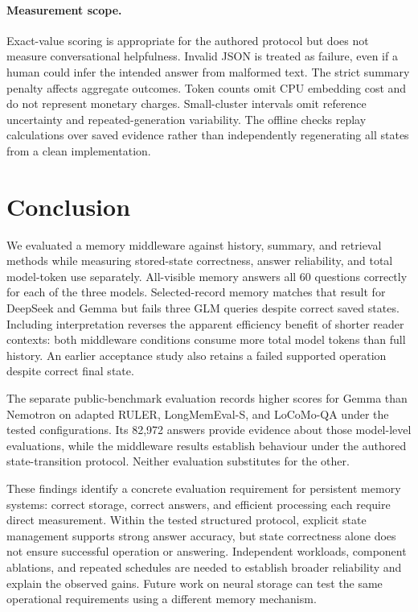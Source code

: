 \documentclass[11pt,a4paper]{article}
\begin{document}
\paragraph{Measurement scope.}
Exact-value scoring is appropriate for the authored protocol but does not measure conversational helpfulness. Invalid JSON is treated as failure, even if a human could infer the intended answer from malformed text. The strict summary penalty affects aggregate outcomes. Token counts omit CPU embedding cost and do not represent monetary charges. Small-cluster intervals omit reference uncertainty and repeated-generation variability. The offline checks replay calculations over saved evidence rather than independently regenerating all states from a clean implementation.

\section{Conclusion}
We evaluated a memory middleware against history, summary, and retrieval methods while measuring stored-state correctness, answer reliability, and total model-token use separately. All-visible memory answers all 60 questions correctly for each of the three models. Selected-record memory matches that result for DeepSeek and Gemma but fails three GLM queries despite correct saved states. Including interpretation reverses the apparent efficiency benefit of shorter reader contexts: both middleware conditions consume more total model tokens than full history. An earlier acceptance study also retains a failed supported operation despite correct final state.

The separate public-benchmark evaluation records higher scores for Gemma than Nemotron on adapted RULER, LongMemEval-S, and LoCoMo-QA under the tested configurations. Its 82,972 answers provide evidence about those model-level evaluations, while the middleware results establish behaviour under the authored state-transition protocol. Neither evaluation substitutes for the other.

These findings identify a concrete evaluation requirement for persistent memory systems: correct storage, correct answers, and efficient processing each require direct measurement. Within the tested structured protocol, explicit state management supports strong answer accuracy, but state correctness alone does not ensure successful operation or answering. Independent workloads, component ablations, and repeated schedules are needed to establish broader reliability and explain the observed gains. Future work on neural storage can test the same operational requirements using a different memory mechanism.
\end{document}
